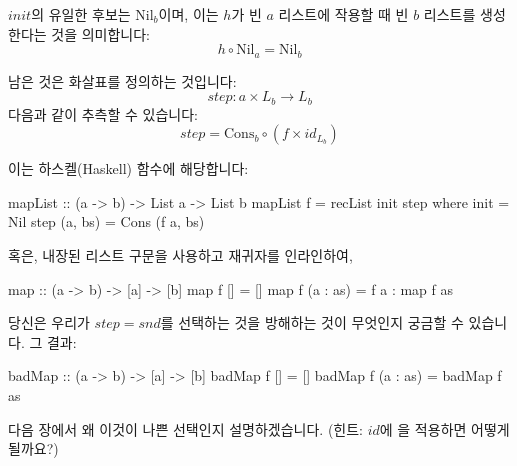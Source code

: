 \documentclass[DaoFP]{subfiles}
\begin{document}
$\mathit{init}$의 유일한 후보는 $\text{Nil}_b$이며, 이는 $h$가 빈 $a$ 리스트에 작용할 때 빈 $b$ 리스트를 생성한다는 것을 의미합니다:
\[ h \circ \text{Nil}_a = \text{Nil}_b \]

남은 것은 화살표를 정의하는 것입니다:
\[\mathit{step} \colon a \times L_b \to L_b\]
다음과 같이 추측할 수 있습니다:
\[ \mathit{step} = \text{Cons}_b \circ (f \times id_{L_b}) \]

이는 하스켈(Haskell) 함수에 해당합니다:

\begin{haskell}
mapList :: (a -> b) -> List a -> List b
mapList f = recList init step
  where
    init = Nil
    step (a, bs) = Cons (f a, bs)
\end{haskell}
혹은, 내장된 리스트 구문을 사용하고 재귀자를 인라인하여,
\begin{haskell}
map :: (a -> b) -> [a] -> [b]
map f [] = []
map f (a : as) = f a : map f as
\end{haskell}

당신은 우리가 $\mathit{step} = \mathit{snd}$를 선택하는 것을 방해하는 것이 무엇인지 궁금할 수 있습니다. 그 결과:
\begin{haskell}
badMap :: (a -> b) -> [a] -> [b]
badMap f [] = []
badMap f (a : as) = badMap f as
\end{haskell}
다음 장에서 왜 이것이 나쁜 선택인지 설명하겠습니다. (힌트: $id$에 을 적용하면 어떻게 될까요?)
\end{document}
